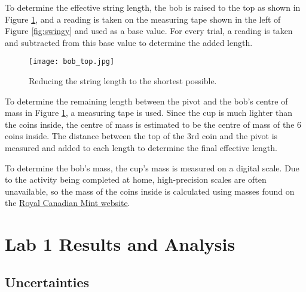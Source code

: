 \documentclass[aps,twocolumn,secnumarabic,nobalancelastpage,amsmath,amssymb,nofootinbib,floatfix,letterpaper]{revtex4}
\begin{document}
To determine the effective string length, the bob is raised to the top as shown in Figure \ref{fig:raised_bob}, and a
reading is taken on the measuring tape shown in the left of Figure \ref{fig:swingy} and used as a base value. For
every trial, a reading is taken and subtracted from this base value to determine the added length.

\begin{figure}[htb]
    \texttt{[image: bob\_top.jpg]}
    \caption{Reducing the string length to the shortest possible.}
    \label{fig:raised_bob}
\end{figure}

To determine the remaining length between the pivot and the bob's centre of mass in Figure \ref{fig:raised_bob}, a
measuring tape is used. Since the cup is much lighter than the coins inside, the centre of mass is estimated to be the
centre of mass of the 6 coins inside. The distance between the top of the 3rd coin and the pivot is measured and added
to each length to determine the final effective length.

To determine the bob's mass, the cup's mass is measured on a digital scale. Due to the activity being completed at home,
high-precision scales are often unavailable, so the mass of the coins inside is calculated using masses found on the
\href{https://www.mint.ca/store/mint/learn/canadian-circulation-1100028}{Royal Canadian Mint website}.


\section{Lab 1 Results and Analysis}

\subsection{Uncertainties}
\end{document}
